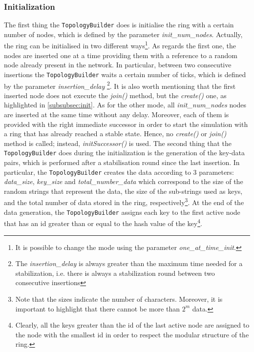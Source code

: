 \documentclass[11pt,twocolumn,letterpaper]{article}
\begin{document}
	\subsubsection{Initialization}
	\label{subsubsec:top-init}
	The first thing the \texttt{TopologyBuilder} does is initialise the ring with a certain number of nodes, which is defined by the parameter \textit{init\_num\_nodes}. Actually, the ring can be initialised in two different ways\footnote{It is possible to change the mode using the parameter \textit{one\_at\_time\_init}.}. As regards the first one, the nodes are inserted one at a time providing them with a reference to a random node already present in the network. In particular, between two consecutive insertions the \texttt{TopologyBuilder} waits a certain number of ticks, which is defined by the parameter \textit{insertion\_delay} \footnote{The \textit{insertion\_delay} is always greater than the maximum time needed for a stabilization, i.e. there is always a stabilization round between two consecutive insertions}. It is also worth mentioning that the first inserted node does not execute the \textit{join()} method, but the \textit{create()} one, as highlighted in \cref{subsubsec:init}. As for the other mode, all \textit{init\_num\_nodes} nodes are inserted at the same time without any delay. Moreover, each of them is provided with the right immediate successor in order to start the simulation with a ring that has already reached a stable state. Hence, no \textit{create()} or \textit{join()} method is called; instead, \textit{initSuccessor()} is used. \newline
	The second thing that the \texttt{TopologyBuilder} does during the initialization is the generation of the key-data pairs, which is performed after a stabilisation round since the last insertion. In particular, the \texttt{TopologyBuilder} creates the data according to 3 parameters: \textit{data\_size}, \textit{key\_size} and \textit{total\_number\_data} which correspond to the size of the random strings that represent the data, the size of the sub-strings used as keys, and the total number of data stored in the ring, respectively\footnote{Note that the sizes indicate the number of characters. Moreover, it is important to highlight that there cannot be more than $2^m$ data.}. At the end of the data generation, the \texttt{TopologyBuilder} assigns each key to the first active node that has an id greater than or equal to the hash value of the key\footnote{Clearly, all the keys greater than the id of the last active node are assigned to the node with the smallest id in order to respect the modular structure of the ring.}.
	
\end{document}
